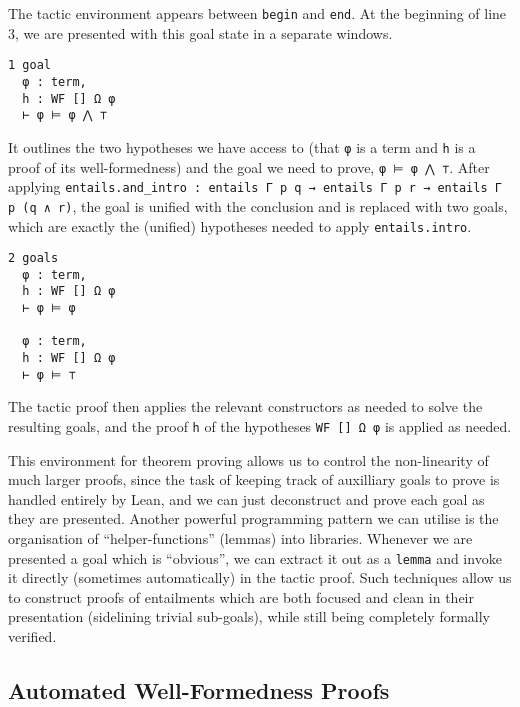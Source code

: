 \documentclass[12pt,leqno]{article}
\def\lc{\lstinline}
\theoremstyle{example}
\numberwithin{equation}{section}
\begin{document}
The tactic environment appears between \lc{begin} and \lc{end}. At the beginning of line 3, we are presented with this goal state in a separate windows.
\begin{lstlisting}[frame=single]
  1 goal
  φ : term,
  h : WF [] Ω φ
  ⊢ φ ⊨ φ ⋀ ⊤
\end{lstlisting}
It outlines the two hypotheses we have access to (that \lc{φ} is a term and \lc{h} is a proof of its well-formedness) and the goal we need to prove, \lc{φ ⊨ φ ⋀ ⊤}. After applying \lc{entails.and_intro : entails Γ p q → entails Γ p r → entails Γ p (q ∧ r)}, the goal is unified with the conclusion and is replaced with two goals, which are exactly the (unified) hypotheses needed to apply \lc{entails.intro}.
\begin{lstlisting}[frame=single]
  2 goals
  φ : term,
  h : WF [] Ω φ
  ⊢ φ ⊨ φ
  
  φ : term,
  h : WF [] Ω φ
  ⊢ φ ⊨ ⊤
\end{lstlisting}

The tactic proof then applies the relevant constructors as needed to solve the resulting goals, and the proof \lc{h} of the hypotheses \lc{WF [] Ω φ} is applied as needed.

This environment for theorem proving allows us to control the non-linearity of much larger proofs, since the task of keeping track of auxilliary goals to prove is handled entirely by Lean, and we can just deconstruct and prove each goal as they are presented. Another powerful programming pattern we can utilise is the organisation of ``helper-functions'' (lemmas) into libraries. Whenever we are presented a goal which is ``obvious'', we can extract it out as a \lc{lemma} and invoke it directly (sometimes automatically) in the tactic proof. Such techniques allow us to construct proofs of entailments which are both focused and clean in their presentation (sidelining trivial sub-goals), while still being completely formally verified.

\subsection{Automated Well-Formedness Proofs}
\end{document}
